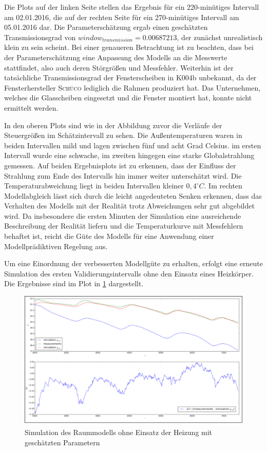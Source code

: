 Die Plots auf der linken Seite stellen das Ergebnis für ein 220-minütiges Intervall am 02.01.2016, die auf der rechten Seite für ein 270-minütiges Intervall am 05.01.2016 dar. Die Parameterschätzung ergab einen geschätzten Transmissionsgrad von $window_{transmission}=0.00687213$, der zunächst unrealistisch klein zu sein scheint. Bei einer genaueren Betrachtung ist zu beachten, dass bei der Parameterschätzung eine Anpassung des Modells an die Messwerte stattfindet, also auch deren Störgrößen und Messfehler. Weiterhin ist der tatsächliche Transmissionsgrad der Fensterscheiben in K004b unbekannt, da der Fensterhersteller \textsc{Schüco} lediglich die Rahmen produziert hat. Das Unternehmen, welches die Glasscheiben eingesetzt und die Fenster montiert hat, konnte nicht ermittelt werden. 

In den oberen Plots sind wie in der Abbildung zuvor die Verläufe der Steuergrößen im Schätzintervall zu sehen. Die Außentemperaturen waren in beiden Intervallen mild und lagen zwischen fünf und acht Grad Celsius. im ersten Intervall wurde eine schwache, im zweiten hingegen eine starke Globalstrahlung gemessen. Auf beiden Ergebnisplots ist zu erkennen, dass der Einfluss der Strahlung zum Ende des Intervalls hin immer weiter unterschätzt wird. Die Temperaturabweichung liegt in beiden Intervallen kleiner $0,4^{\circ}C$. Im rechten Modellabgleich lässt sich durch die leicht angedeuteten Senken erkennen, dass das Verhalten des Modells mit der Realität trotz Abweichungen sehr gut abgebildet wird.
Da insbesondere die ersten Minuten der Simulation eine ausreichende Beschreibung der Realität liefern und die Temperaturkurve mit Messfehlern behaftet ist, reicht die Güte des Modells für eine Anwendung einer Modellprädiktiven Regelung aus. 


Um eine Einordnung der verbesserten Modellgüte zu erhalten, erfolgt eine erneute Simulation des ersten Validierungsintervalls ohne den Einsatz eines Heizkörper. Die Ergebnisse sind im Plot in \ref{fig:valid1pe} dargestellt.

\begin{figure}
\centering
\includegraphics[width=\textwidth]{abbildungen/20160329_validierung1pe}
\caption{Simulation des Raummodells ohne Einsatz der Heizung mit geschätzten Parametern}
\label{fig:valid1pe}
\end{figure}

